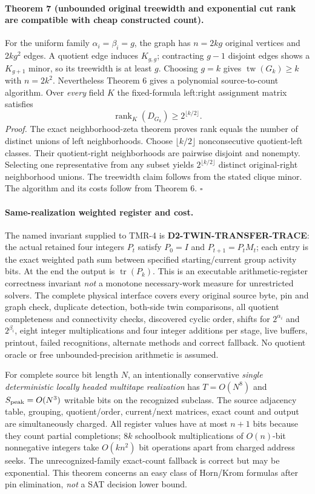 \documentclass[11pt]{article}
\begin{document}
\paragraph{Theorem 7 (unbounded original treewidth and exponential cut rank are compatible with cheap constructed count).}
For the uniform family $\alpha_i=\beta_i=g$, the graph has $n=2kg$ original vertices and $2kg^2$ edges. A quotient edge induces $K_{g,g}$; contracting $g-1$ disjoint edges shows a $K_{g+1}$ minor, so its treewidth is at least $g$. Choosing $g=k$ gives $\operatorname{tw}(G_k)\ge k$ with $n=2k^2$. Nevertheless Theorem 6 gives a polynomial source-to-count algorithm. Over \emph{every} field $K$ the fixed-formula left:right assignment matrix satisfies
\[
\operatorname{rank}_{K}(D_{G_k})\ge 2^{\lfloor k/2\rfloor}.
\]
\emph{Proof.} The exact neighborhood-zeta theorem proves rank equals the number of distinct unions of left neighborhoods. Choose $\lfloor k/2\rfloor$ nonconsecutive quotient-left classes. Their quotient-right neighborhoods are pairwise disjoint and nonempty. Selecting one representative from any subset yields $2^{\lfloor k/2\rfloor}$ distinct original-right neighborhood unions. The treewidth claim follows from the stated clique minor. The algorithm and its costs follow from Theorem 6. \hfill$\square$

\paragraph{Same-realization weighted register and cost.}
The named invariant supplied to TMR-4 is \textbf{D2-TWIN-TRANSFER-TRACE}: the actual retained four integers $P_t$ satisfy $P_0=I$ and $P_{t+1}=P_tM_t$; each entry is the exact weighted path sum between specified starting/current group activity bits. At the end the output is $\operatorname{tr}(P_k)$. This is an executable arithmetic-register correctness invariant \emph{not} a monotone necessary-work measure for unrestricted solvers. The complete physical interface covers every original source byte, pin and graph check, duplicate detection, both-side twin comparisons, all quotient completeness and connectivity checks, discovered cyclic order, shifts for $2^{\alpha_i}$ and $2^{\beta_i}$, eight integer multiplications and four integer additions per stage, live buffers, printout, failed recognitions, alternate methods and correct fallback. No quotient oracle or free unbounded-precision arithmetic is assumed.

For complete source bit length $N$, an intentionally conservative \emph{single deterministic locally headed multitape realization} has $T=O(N^8)$ and $S_{\rm peak}=O(N^3)$ writable bits on the recognized subclass. The source adjacency table, grouping, quotient/order, current/next matrices, exact count and output are simultaneously charged. All register values have at most $n+1$ bits because they count partial completions; $8k$ schoolbook multiplications of $O(n)$-bit nonnegative integers take $O(kn^2)$ bit operations apart from charged address seeks. The unrecognized-family exact-count fallback is correct but may be exponential. This theorem concerns an easy class of Horn/Krom formulas after pin elimination, \emph{not} a SAT decision lower bound.
\end{document}
